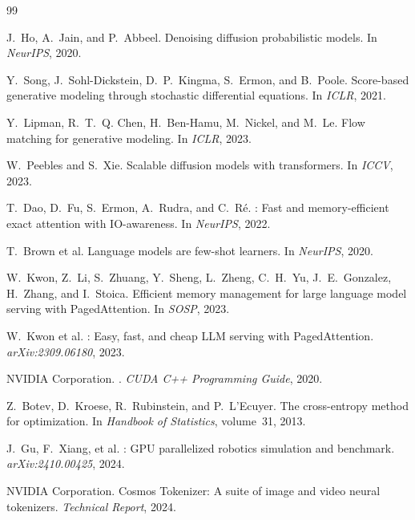\documentclass[letterpaper,twocolumn,10pt]{article}
\begin{document}
\begin{thebibliography}{99}

J.~Ho, A.~Jain, and P.~Abbeel.
\newblock Denoising diffusion probabilistic models.
\newblock In \emph{NeurIPS}, 2020.

Y.~Song, J.~Sohl-Dickstein, D.~P.~Kingma, S.~Ermon, and B.~Poole.
\newblock Score-based generative modeling through stochastic differential
  equations.
\newblock In \emph{ICLR}, 2021.

Y.~Lipman, R.~T.~Q. Chen, H.~Ben-Hamu, M.~Nickel, and M.~Le.
\newblock Flow matching for generative modeling.
\newblock In \emph{ICLR}, 2023.

W.~Peebles and S.~Xie.
\newblock Scalable diffusion models with transformers.
\newblock In \emph{ICCV}, 2023.

T.~Dao, D.~Fu, S.~Ermon, A.~Rudra, and C.~R\'e.
: Fast and memory-efficient exact attention with
  IO-awareness.
\newblock In \emph{NeurIPS}, 2022.

T.~Brown et al.
\newblock Language models are few-shot learners.
\newblock In \emph{NeurIPS}, 2020.

W.~Kwon, Z.~Li, S.~Zhuang, Y.~Sheng, L.~Zheng, C.~H.~Yu,
  J.~E.~Gonzalez, H.~Zhang, and I.~Stoica.
\newblock Efficient memory management for large language model serving with
  {PagedAttention}.
\newblock In \emph{SOSP}, 2023.

W.~Kwon et al.
: Easy, fast, and cheap {LLM} serving with {PagedAttention}.
\newblock \emph{arXiv:2309.06180}, 2023.

NVIDIA Corporation.
.
\newblock \emph{CUDA C++ Programming Guide}, 2020.

Z.~Botev, D.~Kroese, R.~Rubinstein, and P.~L'Ecuyer.
\newblock The cross-entropy method for optimization.
\newblock In \emph{Handbook of Statistics}, volume~31, 2013.

J.~Gu, F.~Xiang, et al.
: {GPU} parallelized robotics simulation and benchmark.
\newblock \emph{arXiv:2410.00425}, 2024.

NVIDIA Corporation.
\newblock Cosmos Tokenizer: A suite of image and video neural tokenizers.
\newblock \emph{Technical Report}, 2024.

\end{thebibliography}
\end{document}
